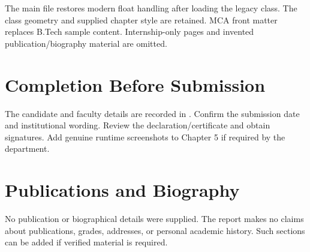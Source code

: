The main file restores modern float handling after loading the legacy class. The class geometry and supplied chapter style are retained. MCA front matter replaces B.Tech sample content. Internship-only pages and invented publication/biography material are omitted.

\section{Completion Before Submission}
The candidate and faculty details are recorded in . Confirm the submission date and institutional wording. Review the declaration/certificate and obtain signatures. Add genuine runtime screenshots to Chapter 5 if required by the department.

\section*{Publications and Biography}
No publication or biographical details were supplied. The report makes no claims about publications, grades, addresses, or personal academic history. Such sections can be added if verified material is required.
